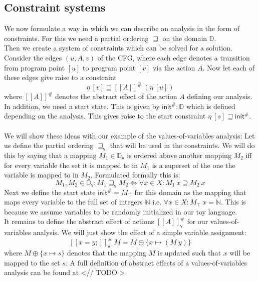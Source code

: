     \subsection{Constraint systems}
    We now formulate a way in which we can describe an analysis in the form of constraints. For this we need a partial ordering $\sqsupseteq$ on the domain $\mathbb{D}$.\\
    Then we create a system of constraints which can be solved for a solution. Consider the edges $(u, A, v)$ of the \ac{CFG}, where each edge denotes a transition from program point $[u]$ to program point $[v]$ via the action $A$. Now let each of these edges give raise to a constraint
    \[\eta\ [v] \sqsupseteq [\![A]\!]^{\#}\ (\eta\ [u])\]
    where $[\![A]\!]^{\#}$ denotes the abstract effect of the action $A$ defining our analysis. In addition, we need a start state. This is given by $\textsf{init}^{\#}: \mathbb{D}$ which is defined depending on the analysis. This gives raise to the start constraint $\eta\ [s] \sqsupseteq \textsf{init}^{\#}$.\\
    \\
    We will show these ideas with our example of the values-of-variables analysis: Let us define the partial ordering $\sqsupseteq_\textsf{v}$ that will be used in the constraints. We will do this by saying that a mapping $M_1 \in \mathbb{D}_\textsf{v}$ is ordered above another mapping $M_2$ iff for every variable the set it is mapped to in $M_1$ is a superset of the one the variable is mapped to in $M_2$. Formulated formally this is:
    \[M_1, M_2 \in \mathbb{D}_\textsf{v}: M_1 \sqsupseteq_\textsf{v} M_2 \Longleftrightarrow \forall x \in X: M_1\ x \supseteq M_2\ x\]
    Next we define the start state $\textsf{init}^{\#} = M_\top$ for this domain as the mapping that maps every variable to the full set of integers $\mathbb{N}$ i.e. $\forall x \in X: M_\top\ x = \mathbb{N}$. This is because we assume variables to be randomly initialized in our toy language.\\
    It remains to define the abstract effect of actions $[\![A]\!]^{\#}_\textsf{v}$ for our values-of-variables analysis. We will just show the effect of a simple variable assignment:
    \[ [\![ x=y; ]\!]^{\#}_\textsf{v}\ M = M \oplus \{x \mapsto (M\ y) \} \]
    where $M \oplus \{x \mapsto s\}$ denotes that the mapping $M$ is updated such that $x$ will be mapped to the set $s$. A full definition of abstract effects of a values-of-variables analysis can be found at <// TODO >.\\

